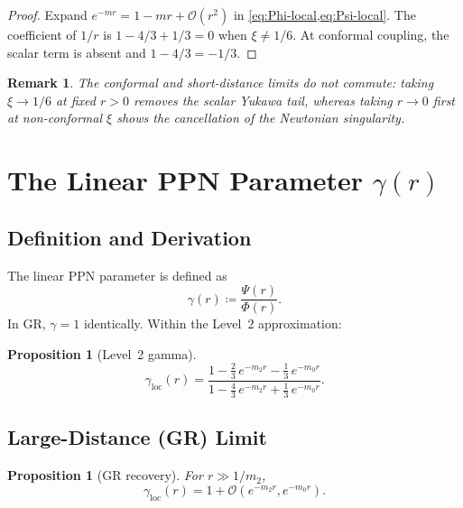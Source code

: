 \documentclass[11pt,a4paper]{article}
\newcommand{\order}{\mathcal{O}}
\newtheorem{proposition}[theorem]{Proposition}
\newtheorem{remark}[theorem]{Remark}
\begin{document}
\begin{proof}
Expand $e^{-mr} = 1 - mr + \order(r^2)$ in
\cref{eq:Phi-local,eq:Psi-local}.  The coefficient of $1/r$ is
$1 - 4/3 + 1/3 = 0$ when $\xi \neq 1/6$.  At conformal coupling, the
scalar term is absent and $1 - 4/3 = -1/3$.
\end{proof}

\begin{remark}
The conformal and short-distance limits do not commute: taking
$\xi \to 1/6$ at fixed $r > 0$ removes the scalar Yukawa tail, whereas
taking $r \to 0$ first at non-conformal $\xi$ shows the cancellation of
the Newtonian singularity.
\end{remark}


\section{The Linear PPN Parameter \texorpdfstring{$\gamma(r)$}{gamma(r)}}
\label{sec:gamma}

\subsection{Definition and Derivation}

The linear PPN parameter is defined as
\begin{equation}\label{eq:gamma-def}
  \gamma(r) \coloneqq \frac{\Psi(r)}{\Phi(r)}.
\end{equation}
In GR, $\gamma = 1$ identically.  Within the Level~2 approximation:

\begin{proposition}[Level~2 gamma]
\label{prop:gamma}
\begin{equation}\label{eq:gamma-local}
  \boxed{
  \gamma_{\mathrm{loc}}(r)
  =
  \frac{
    1 - \frac{2}{3}\,e^{-m_2 r} - \frac{1}{3}\,e^{-m_0 r}
  }{
    1 - \frac{4}{3}\,e^{-m_2 r} + \frac{1}{3}\,e^{-m_0 r}
  }.}
\end{equation}
\end{proposition}

\subsection{Large-Distance (GR) Limit}

\begin{proposition}[GR recovery]
For $r \gg 1/m_2$,
\begin{equation}
  \gamma_{\mathrm{loc}}(r) = 1 + \order(e^{-m_2 r}, e^{-m_0 r}).
\end{equation}
\end{proposition}
\end{document}
